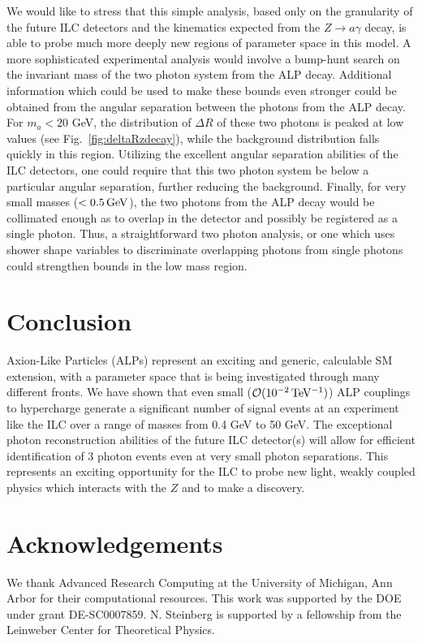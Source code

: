 \documentclass[aps,onecolumn,twoside,secnumarabic,12pt,balancelastpage,amsmath,amssymb,nofootinbib,hyperref=pdftex]{revtex4}
\begin{document}
We would like to stress that this simple analysis, based only on the granularity of the future ILC detectors and the kinematics expected from the $Z\rightarrow a\gamma$ decay, is able to probe much more deeply new regions of parameter space in this model. A more sophisticated experimental analysis would involve a bump-hunt search on the invariant mass of the two photon system from the ALP decay. Additional information which could be used to make these bounds even stronger could be obtained from the angular separation between the photons from the ALP decay. For $m_{a} < 20$ GeV, the distribution of $\Delta R$ of these two photons is peaked at low values (see Fig.~\ref{fig:deltaRzdecay}), while the background distribution falls quickly in this region. Utilizing the excellent angular separation abilities of the ILC detectors, one could require that this two photon system be below a particular angular separation, further reducing the background. Finally, for very small masses ($< 0.5\,\rm{GeV}$), the two photons from the ALP decay would be collimated enough as to overlap in the detector and possibly be registered as a single photon. Thus, a straightforward two photon analysis, or one which uses shower shape variables to discriminate overlapping photons from single photons could strengthen bounds in the low mass region.
\section{Conclusion}
Axion-Like Particles (ALPs) represent an exciting and generic, calculable SM extension, with a parameter space that is being investigated through many different fronts. We have shown that even small ($\mathcal{O}(10^{-2}\,\rm{TeV^{-1}})$) ALP couplings to hypercharge generate a significant number of signal events at an experiment like the ILC over a range of masses from 0.4 GeV to 50 GeV. The exceptional photon reconstruction abilities of the future ILC detector(s) will allow for efficient identification of 3 photon events even at very small photon separations. This represents an exciting opportunity for the ILC to probe new light, weakly coupled physics which interacts with the $Z$ and to make a discovery.
\section{Acknowledgements}
We thank Advanced Research Computing at the University of Michigan, Ann Arbor for their computational resources. This work was supported by the DOE under grant DE-SC0007859. N. Steinberg is supported by a fellowship from the Leinweber Center for Theoretical Physics.




\end{document}
